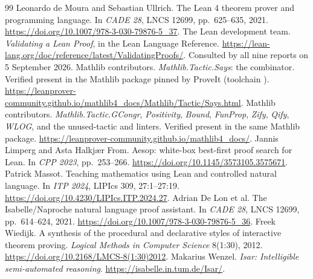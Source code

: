 \documentclass[11pt,a4paper]{article}
\newcommand{\code}[1]{\texttt{\detokenize{#1}}}
\theoremstyle{definition}
\begin{document}
\begin{thebibliography}{99}
 Leonardo de Moura and Sebastian Ullrich. The Lean 4 theorem prover and programming language. In \emph{CADE 28}, LNCS 12699, pp.~625--635, 2021. \url{https://doi.org/10.1007/978-3-030-79876-5_37}.
 The Lean development team. \emph{Validating a Lean Proof}, in the Lean Language Reference. \url{https://lean-lang.org/doc/reference/latest/ValidatingProofs/}. Consulted by all nine reports on 5 September 2026.
 Mathlib contributors. \emph{Mathlib.Tactic.Says}: the \code{says} combinator. Verified present in the Mathlib package pinned by ProveIt (toolchain \code{v4.32.0}). \url{https://leanprover-community.github.io/mathlib4_docs/Mathlib/Tactic/Says.html}.
 Mathlib contributors. \emph{Mathlib.Tactic.GCongr}, \emph{Positivity}, \emph{Bound}, \emph{FunProp}, \emph{Zify}, \emph{Qify}, \emph{WLOG}, and the unused-tactic and \code{haveLet} linters. Verified present in the same Mathlib package. \url{https://leanprover-community.github.io/mathlib4_docs/}.
 Jannis Limperg and Asta Halkj\ae r From. Aesop: white-box best-first proof search for Lean. In \emph{CPP 2023}, pp.~253--266. \url{https://doi.org/10.1145/3573105.3575671}.
 Patrick Massot. Teaching mathematics using Lean and controlled natural language. In \emph{ITP 2024}, LIPIcs 309, 27:1--27:19. \url{https://doi.org/10.4230/LIPIcs.ITP.2024.27}.
 Adrian De Lon et al. The Isabelle/Naproche natural language proof assistant. In \emph{CADE 28}, LNCS 12699, pp.~614--624, 2021. \url{https://doi.org/10.1007/978-3-030-79876-5_36}.
 Freek Wiedijk. A synthesis of the procedural and declarative styles of interactive theorem proving. \emph{Logical Methods in Computer Science} 8(1:30), 2012. \url{https://doi.org/10.2168/LMCS-8(1:30)2012}.
 Makarius Wenzel. \emph{Isar: Intelligible semi-automated reasoning}. \url{https://isabelle.in.tum.de/Isar/}.
\end{thebibliography}
\end{document}
